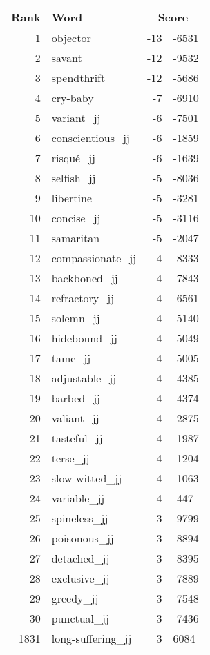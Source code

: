 \begin{longtable}[!htbp]{| rlr@{.}l |}
    \hline
    \textbf{Rank} & \textbf{Word} & \multicolumn{2}{c|}{\textbf{Score}} \\
    \hline
    \endhead
    1 & objector & -13 & -6531 \\
    2 & savant & -12 & -9532 \\
    3 & spendthrift & -12 & -5686 \\
    4 & cry-baby & -7 & -6910 \\
    5 & variant\_jj & -6 & -7501 \\
    6 & conscientious\_jj & -6 & -1859 \\
    7 & risqué\_jj & -6 & -1639 \\
    8 & selfish\_jj & -5 & -8036 \\
    9 & libertine & -5 & -3281 \\
    10 & concise\_jj & -5 & -3116 \\
    11 & samaritan & -5 & -2047 \\
    12 & compassionate\_jj & -4 & -8333 \\
    13 & backboned\_jj & -4 & -7843 \\
    14 & refractory\_jj & -4 & -6561 \\
    15 & solemn\_jj & -4 & -5140 \\
    16 & hidebound\_jj & -4 & -5049 \\
    17 & tame\_jj & -4 & -5005 \\
    18 & adjustable\_jj & -4 & -4385 \\
    19 & barbed\_jj & -4 & -4374 \\
    20 & valiant\_jj & -4 & -2875 \\
    21 & tasteful\_jj & -4 & -1987 \\
    22 & terse\_jj & -4 & -1204 \\
    23 & slow-witted\_jj & -4 & -1063 \\
    24 & variable\_jj & -4 & -447 \\
    25 & spineless\_jj & -3 & -9799 \\
    26 & poisonous\_jj & -3 & -8894 \\
    27 & detached\_jj & -3 & -8395 \\
    28 & exclusive\_jj & -3 & -7889 \\
    29 & greedy\_jj & -3 & -7548 \\
    30 & punctual\_jj & -3 & -7436 \\
    1831 & long-suffering\_jj & 3 & 6084 \\

\end{longtable}

